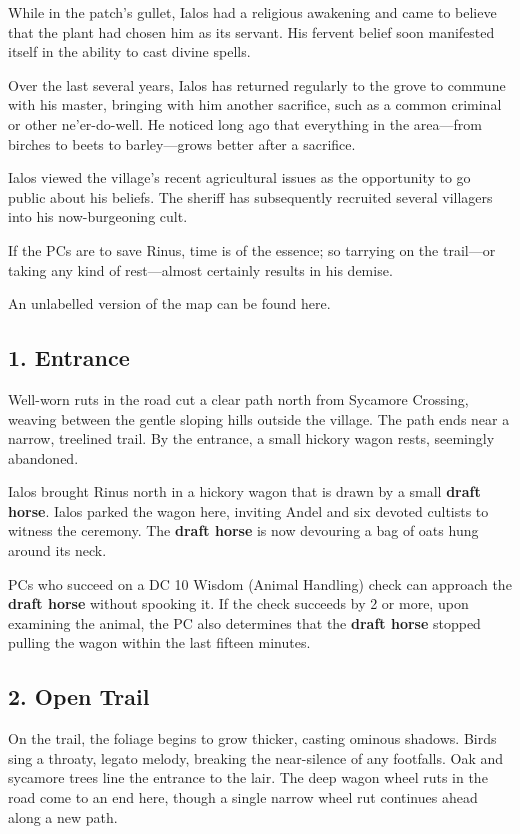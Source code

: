 \documentclass[10pt,a4paper,twoside,bg=print,twocolumn,openany,nodeprecatedcode]{dndbook}
\begin{document}
While in the patch's gullet, Ialos had a religious awakening and came to believe that the plant had chosen him as its servant. His fervent belief soon manifested itself in the ability to cast divine spells.

Over the last several years, Ialos has returned regularly to the grove to commune with his master, bringing with him another sacrifice, such as a common criminal or other ne'er-do-well. He noticed long ago that everything in the area—from birches to beets to barley—grows better after a sacrifice.

Ialos viewed the village's recent agricultural issues as the opportunity to go public about his beliefs. The sheriff has subsequently recruited several villagers into his now-burgeoning cult.

If the PCs are to save Rinus, time is of the essence; so tarrying on the trail—or taking any kind of rest—almost certainly results in his demise.

An unlabelled version of the map can be found here.

\subsection{1. Entrance}
\begin{DndReadAloud}{}
Well-worn ruts in the road cut a clear path north from Sycamore Crossing, weaving between the gentle sloping hills outside the village. The path ends near a narrow, treelined trail. By the entrance, a small hickory wagon rests, seemingly abandoned.

\end{DndReadAloud}

Ialos brought Rinus north in a hickory wagon that is drawn by a small \textbf{draft horse}. Ialos parked the wagon here, inviting Andel and six devoted cultists to witness the ceremony. The \textbf{draft horse} is now devouring a bag of oats hung around its neck.

PCs who succeed on a DC 10 Wisdom (Animal Handling) check can approach the \textbf{draft horse} without spooking it. If the check succeeds by 2 or more, upon examining the animal, the PC also determines that the \textbf{draft horse} stopped pulling the wagon within the last fifteen minutes.

\subsection{2. Open Trail}
\begin{DndReadAloud}{}
On the trail, the foliage begins to grow thicker, casting ominous shadows. Birds sing a throaty, legato melody, breaking the near-silence of any footfalls. Oak and sycamore trees line the entrance to the lair. The deep wagon wheel ruts in the road come to an end here, though a single narrow wheel rut continues ahead along a new path.

\end{DndReadAloud}
\end{document}
